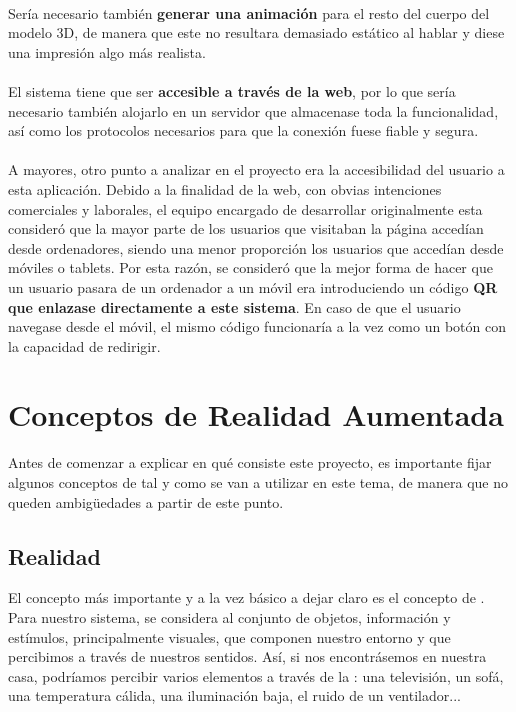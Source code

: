 \documentclass{subfiles}
\begin{document}
        \paragraph{}
        {Sería necesario también \textbf{generar una animación} para el resto del cuerpo del modelo 3D, de manera que este no resultara demasiado estático al hablar y diese una impresión algo más realista.}
        
        \paragraph{}
        {El sistema tiene que ser \textbf{accesible a través de la web}, por lo que sería necesario también alojarlo en un servidor que almacenase toda la funcionalidad, así como los protocolos necesarios para que la conexión fuese fiable y segura.}

        \paragraph{}
        {A mayores, otro punto a analizar en el proyecto era la accesibilidad del usuario a esta aplicación. Debido a la finalidad de la web, con obvias intenciones comerciales y laborales, el equipo encargado de desarrollar originalmente esta consideró que la mayor parte de los usuarios que visitaban la página accedían desde ordenadores, siendo una menor proporción los usuarios que accedían desde móviles o tablets. Por esta razón, se consideró que la mejor forma de hacer que un usuario pasara de un ordenador a un móvil era introduciendo un código \textbf{QR que enlazase directamente a este sistema}. En caso de que el usuario navegase desde el móvil, el mismo código funcionaría a la vez como un botón con la capacidad de redirigir.}


        \section{Conceptos de Realidad Aumentada}
        \label{sec:conceptos_de_realidad_aumentada}

        Antes de comenzar a explicar en qué consiste este proyecto, es importante fijar algunos conceptos de \ra tal y como se van a utilizar en este tema, de manera que no queden ambigüedades a partir de este punto.

        \subsection{Realidad}
        \label{sec:realidad}
        El concepto más importante y a la vez básico a dejar claro es el concepto de \realidad. Para nuestro sistema, se considera \realidad al conjunto de objetos, información y estímulos, principalmente visuales, que componen nuestro entorno y que percibimos a través de nuestros sentidos. Así, si nos encontrásemos en nuestra casa, podríamos percibir varios elementos a través de la \realidad: una televisión, un sofá, una temperatura cálida, una iluminación baja, el ruido de un ventilador...
\end{document}
